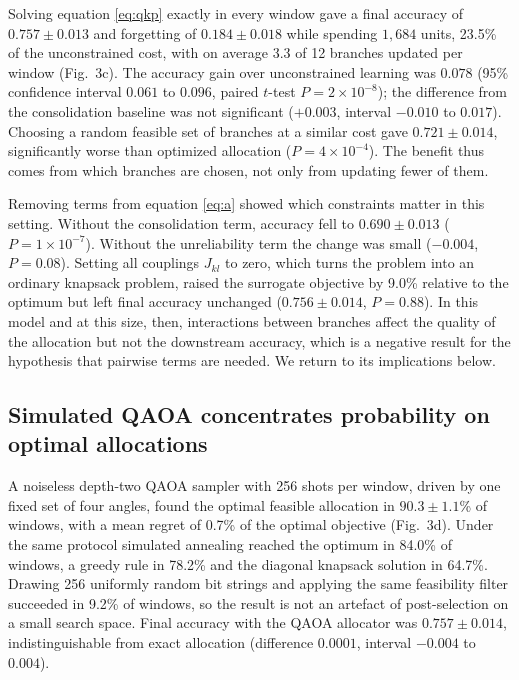 Solving equation \eqref{eq:qkp} exactly in every window gave a final accuracy of $0.757\pm0.013$ and forgetting of $0.184\pm0.018$ while spending $1{,}684$ units, 23.5\% of the unconstrained cost, with on average 3.3 of 12 branches updated per window (Fig.~3c). The accuracy gain over unconstrained learning was $0.078$ (95\% confidence interval $0.061$ to $0.096$, paired $t$-test $P=2\times10^{-8}$); the difference from the consolidation baseline was not significant ($+0.003$, interval $-0.010$ to $0.017$). Choosing a random feasible set of branches at a similar cost gave $0.721\pm0.014$, significantly worse than optimized allocation ($P=4\times10^{-4}$). The benefit thus comes from which branches are chosen, not only from updating fewer of them.

Removing terms from equation \eqref{eq:a} showed which constraints matter in this setting. Without the consolidation term, accuracy fell to $0.690\pm0.013$ ($P=1\times10^{-7}$). Without the unreliability term the change was small ($-0.004$, $P=0.08$). Setting all couplings $J_{kl}$ to zero, which turns the problem into an ordinary knapsack problem, raised the surrogate objective by 9.0\% relative to the optimum but left final accuracy unchanged ($0.756\pm0.014$, $P=0.88$). In this model and at this size, then, interactions between branches affect the quality of the allocation but not the downstream accuracy, which is a negative result for the hypothesis that pairwise terms are needed. We return to its implications below.

\subsection*{Simulated QAOA concentrates probability on optimal allocations}

A noiseless depth-two QAOA sampler with 256 shots per window, driven by one fixed set of four angles, found the optimal feasible allocation in $90.3\pm1.1$\% of windows, with a mean regret of 0.7\% of the optimal objective (Fig.~3d). Under the same protocol simulated annealing reached the optimum in 84.0\% of windows, a greedy rule in 78.2\% and the diagonal knapsack solution in 64.7\%. Drawing 256 uniformly random bit strings and applying the same feasibility filter succeeded in 9.2\% of windows, so the result is not an artefact of post-selection on a small search space. Final accuracy with the QAOA allocator was $0.757\pm0.014$, indistinguishable from exact allocation (difference $0.0001$, interval $-0.004$ to $0.004$).

